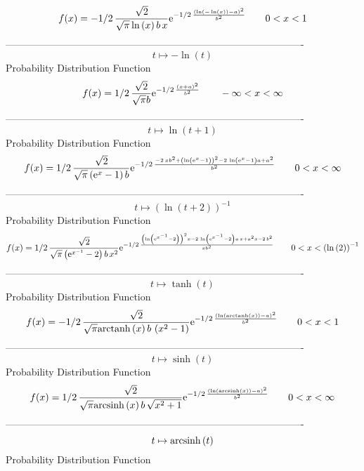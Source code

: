 \documentclass[12pt]{article}
\begin{document}
$$  f(x)=-1/2\,{\frac {\sqrt {2}}{\sqrt {\pi}\ln  \left( x \right) b\,x}{
{\rm e}^{-1/2\,{\frac { \left( \ln  \left( -\ln  \left( x \right) 
 \right) -a \right) ^{2}}{{b}^{2}}}}}}
 \qquad0
 < x < 1
$$-------------------------------------------------------------------------------------------  \\$$t\mapsto -\ln  \left( t \right) 
$$Probability Distribution Function 
$$  f(x)=1/2\,{\frac {\sqrt {2}}{\sqrt {\pi}b}{{\rm e}^{-1/2\,{\frac { \left( x
+a \right) ^{2}}{{b}^{2}}}}}}
 \qquad-\infty 
 < x < \infty 
$$-------------------------------------------------------------------------------------------  \\$$t\mapsto \ln  \left( t+1 \right) 
$$Probability Distribution Function 
$$  f(x)=1/2\,{\frac {\sqrt {2}}{\sqrt {\pi} \left( {{\rm e}^{x}}-1 \right) b}{
{\rm e}^{-1/2\,{\frac {-2\,x{b}^{2}+ \left( \ln  \left( {{\rm e}^{x}}-
1 \right)  \right) ^{2}-2\,\ln  \left( {{\rm e}^{x}}-1 \right) a+{a}^{
2}}{{b}^{2}}}}}}
 \qquad0
 < x < \infty 
$$-------------------------------------------------------------------------------------------  \\$$t\mapsto  \left( \ln  \left( t+2 \right)  \right) ^{-1}
$$Probability Distribution Function 
$$  f(x)=1/2\,{\frac {\sqrt {2}}{\sqrt {\pi} \left( {{\rm e}^{{x}^{-1}}}-2
 \right) b\,{x}^{2}}{{\rm e}^{-1/2\,{\frac { \left( \ln  \left( {
{\rm e}^{{x}^{-1}}}-2 \right)  \right) ^{2}x-2\,\ln  \left( {{\rm e}^{
{x}^{-1}}}-2 \right) a\,x+{a}^{2}x-2\,{b}^{2}}{x{b}^{2}}}}}}
 \qquad0
 < x <  \left( \ln  \left( 2 \right)  \right) ^{-1}
$$-------------------------------------------------------------------------------------------  \\$$t\mapsto \tanh \left( t \right) 
$$Probability Distribution Function 
$$  f(x)=-1/2\,{\frac {\sqrt {2}}{\sqrt {\pi}{\rm arctanh} \left(x\right)b\,
 \left( {x}^{2}-1 \right) }{{\rm e}^{-1/2\,{\frac { \left( \ln 
 \left( {\rm arctanh} \left(x\right) \right) -a \right) ^{2}}{{b}^{2}}
}}}}
 \qquad0
 < x < 1
$$-------------------------------------------------------------------------------------------  \\$$t\mapsto \sinh \left( t \right) 
$$Probability Distribution Function 
$$  f(x)=1/2\,{\frac {\sqrt {2}}{\sqrt {\pi}{\rm arcsinh} \left(x\right)b\,
\sqrt {{x}^{2}+1}}{{\rm e}^{-1/2\,{\frac { \left( \ln  \left( 
{\rm arcsinh} \left(x\right) \right) -a \right) ^{2}}{{b}^{2}}}}}}
 \qquad0
 < x < \infty 
$$-------------------------------------------------------------------------------------------  \\$$t\mapsto {\rm arcsinh} \left(t\right)
$$Probability Distribution Function 
\end{document}
